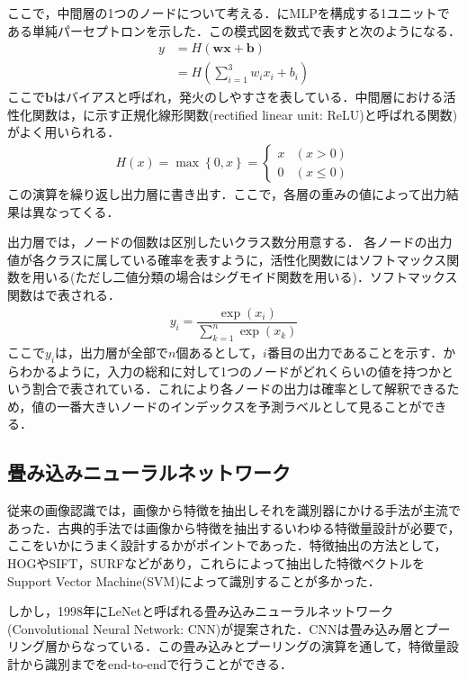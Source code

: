 ここで，中間層の1つのノードについて考える．にMLPを構成する1ユニットである単純パーセプトロンを示した．この模式図を数式で表すと次のようになる．
\begin{align}
	y & = H(\bm{w}\bm{x} + \bm{b}) \\
	& = H\left( \sum_{i=1}^3 w_i x_i + b_i \right) 
\end{align}
ここで$\bm{b}$はバイアスと呼ばれ，発火のしやすさを表している．中間層における活性化関数は，に示す正規化線形関数(rectified linear unit: ReLU)と呼ばれる関数)がよく用いられる．
\begin{align}\label{eq:ReLU}
	H(x) = \max \left\lbrace 0, x \right\rbrace = \begin{cases}
	x & (x > 0) \\
	0 & (x \leq 0)
	\end{cases}
\end{align}
この演算を繰り返し出力層に書き出す．ここで，各層の重みの値によって出力結果は異なってくる．

出力層では，ノードの個数は区別したいクラス数分用意する．
各ノードの出力値が各クラスに属している確率を表すように，活性化関数にはソフトマックス関数を用いる(ただし二値分類の場合はシグモイド関数を用いる)．ソフトマックス関数はで表される．
\begin{align}\label{eq:softmax}
	y_i = \dfrac{\exp(x_i)}{\displaystyle　\sum_{k=1}^n \exp(x_k)}
\end{align}
ここで$y_i$は，出力層が全部で$n$個あるとして，$i$番目の出力であることを示す．からわかるように，入力の総和に対して1つのノードがどれくらいの値を持つかという割合で表されている．これにより各ノードの出力は確率として解釈できるため，値の一番大きいノードのインデックスを予測ラベルとして見ることができる．


\subsection{畳み込みニューラルネットワーク}
従来の画像認識では，画像から特徴を抽出しそれを識別器にかける手法が主流であった．古典的手法では画像から特徴を抽出するいわゆる特徴量設計が必要で，ここをいかにうまく設計するかがポイントであった．特徴抽出の方法として，HOG\cite{HOG}やSIFT\cite{SIFT}，SURF\cite{SURF}などがあり，これらによって抽出した特徴ベクトルをSupport Vector Machine(SVM)\cite{SVM}によって識別することが多かった．

しかし，1998年にLeNetと呼ばれる畳み込みニューラルネットワーク(Convolutional Neural Network: CNN)が提案された\cite{LeNet}．CNNは畳み込み層とプーリング層からなっている．この畳み込みとプーリングの演算を通して，特徴量設計から識別までをend-to-endで行うことができる．

